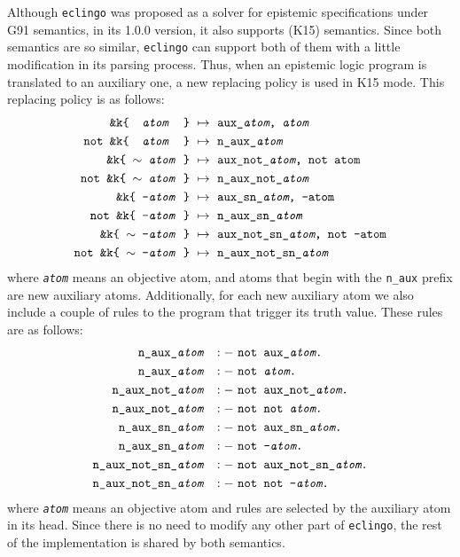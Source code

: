 \documentclass{new_tlp}
\def\eclingo{{\tt eclingo}}
\def\\wviews{{\tt \wviews}}
\def\wviews{{\tt wviews}}
\begin{document}
Although \eclingo{} was proposed as a solver for epistemic specifications under G91 semantics, in its 1.0.0 version, it also supports \cite{kawabagezh15} (K15) semantics.
%
Since both semantics are so similar, \eclingo{} can support both of them with a little modification in its parsing process. Thus, when an epistemic logic program is translated to an auxiliary one, a new replacing policy is used in K15 mode. This replacing policy is as follows:
\begin{align*}
    \texttt{\&k\{ \ \emph{atom} \ \}} \ & \mapsto\ \texttt{aux\_\emph{atom},\ \emph{atom}} \\
    \texttt{not\ \&k\{ \ \emph{atom} \ \}} \ & \mapsto\ \texttt{n\_aux\_\emph{atom}}\\
    \texttt{\&k\{\ $\sim$ \emph{atom}\  \}}\ & \mapsto\ \texttt{aux\_not\_\emph{atom},\ not\ atom} \\
    \texttt{not\ \&k\{\ $\sim$ \emph{atom}\  \}}\ & \mapsto\ \texttt{n\_aux\_not\_\emph{atom}} \\
    \texttt{\&k\{\ {-}\emph{atom}\  \}}\ & \mapsto\ \texttt{aux\_sn\_\emph{atom},\ -atom} \\
    \texttt{not\ \&k\{\ {-}\emph{atom}\  \}}\ & \mapsto\ \texttt{n\_aux\_sn\_\emph{atom}} \\
    \texttt{\&k\{\ $\sim$ {-}\emph{atom}\  \}}\ & \mapsto\ \texttt{aux\_not\_sn\_\emph{atom},\ not\ -atom} \\
    \texttt{not\ \&k\{\ $\sim$ {-}\emph{atom}\  \}}\ & \mapsto\ \texttt{n\_aux\_not\_sn\_\emph{atom}}
\end{align*}
where \texttt{\emph{atom}} means an objective atom, and atoms that begin with the \texttt{n\_aux} prefix are new auxiliary atoms.
%
Additionally, for each new auxiliary atom we also include a couple of rules to the program that trigger its truth value. These rules are as follows:
\begin{align*}
    \texttt{n\_aux\_\emph{atom}} \ &\ :-\ \texttt{not\ aux\_\emph{atom}.} \\
    \texttt{n\_aux\_\emph{atom}} \ &\ :-\ \texttt{not\ \emph{atom}.} \\
    \texttt{n\_aux\_not\_\emph{atom}} \ &\ :-\ \texttt{not\ aux\_not\_\emph{atom}.} \\
    \texttt{n\_aux\_not\_\emph{atom}} \ &\ :-\ \texttt{not\ not\ \emph{atom}.} \\
    \texttt{n\_aux\_sn\_\emph{atom}} \ &\ :-\ \texttt{not\ aux\_sn\_\emph{atom}.} \\
    \texttt{n\_aux\_sn\_\emph{atom}} \ &\ :-\ \texttt{not\ {-}\emph{atom}.} \\
    \texttt{n\_aux\_not\_sn\_\emph{atom}} \ &\ :-\ \texttt{not\ aux\_not\_sn\_\emph{atom}.} \\
    \texttt{n\_aux\_not\_sn\_\emph{atom}} \ &\ :-\ \texttt{not\ not\ {-}\emph{atom}.}
\end{align*}
where \texttt{\emph{atom}} means an objective atom and rules are selected by the auxiliary atom in its head.
%
Since there is no need to modify any other part of \eclingo{}, the rest of the implementation is shared by both semantics.
\end{document}
